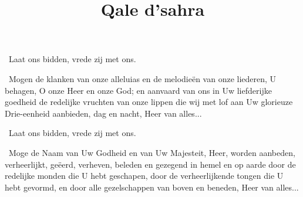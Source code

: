 \documentclass[12pt,twoside,a5paper]{article}
\begin{document}


\begin{halfparskip}
  \dd~Laat ons bidden, vrede zij met ons.

  \cc~Mogen de klanken van onze alleluias en de melodieën van onze liederen, U behagen, O onze Heer en onze God; en aanvaard van ons in Uw liefderijke goedheid de redelijke vruchten van onze lippen die wij met lof aan Uw glorieuze Drie-eenheid aanbieden, dag en nacht, Heer van alles...
\end{halfparskip}


\newpage
\title{Qale d'sahra}
\inlinemaketitle



\begin{halfparskip}
  \dd~Laat ons bidden, vrede zij met ons.

  \cc~Moge de Naam van Uw Godheid en van Uw Majesteit, Heer, worden aanbeden, verheerlijkt, geëerd, verheven, beleden en gezegend in hemel en op aarde door de redelijke monden die U hebt geschapen, door de verheerlijkende tongen die U hebt gevormd, en door alle gezelschappen van boven en beneden, Heer van alles...
\end{halfparskip}


\end{document}
